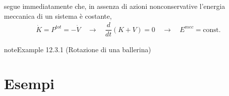 \documentclass[letterpaper,10pt,italian]{jupyterBook}
\begin{document}
\sphinxAtStartPar
segue immediatamente che, in assenza di azioni non\sphinxhyphen{}conservative l’energia meccanica di un sistema è costante,
\begin{equation*}
\begin{split}\dot{K} = P^{tot} = - \dot{V} \quad \rightarrow \quad \dfrac{d}{dt} \left( K + V \right) = 0 \quad \rightarrow \quad E^{mec} = \text{const.}\end{split}
\end{equation*}\label{ch/mechanics/dynamics-conservation:mechanics:dynamics:dancer}
\begin{sphinxadmonition}{note}{Example 12.3.1 (Rotazione di una ballerina)}


\end{sphinxadmonition}

\sphinxstepscope


\section{Esempi}
\label{\detokenize{ch/mechanics/dynamics-examples:esempi}}\label{\detokenize{ch/mechanics/dynamics-examples:physics-hs-mechanics-dynamics-examples}}\label{\detokenize{ch/mechanics/dynamics-examples::doc}}
\end{document}

